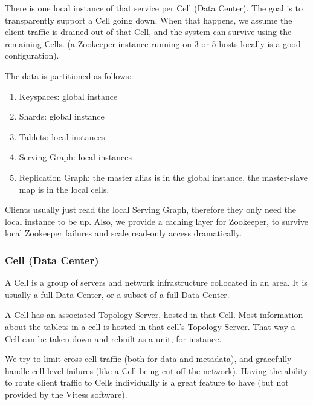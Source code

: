 There is one local instance of that service per Cell (Data Center). The goal is to transparently support a Cell going down. When that happens, we assume the client traffic is drained out of that Cell, and the system can survive
using the remaining Cells. (a Zookeeper instance running on 3 or 5 hosts locally is a good configuration).

The data is partitioned as follows:
\begin{enumerate}
\item Keyspaces: global instance
\item Shards: global instance
\item Tablets: local instances
\item Serving Graph: local instances
\item Replication Graph: the master alias is in the global instance, the master-slave map is in the local cells.
\end{enumerate}


Clients usually just read the local Serving Graph, therefore they only need the local instance to be up. Also, we provide a caching layer for Zookeeper, to survive local Zookeeper failures and scale read-only access dramatically.

\subsubsection{Cell (Data Center)}\hypertarget{cell-data-center}{}\label{cell-data-center}

A Cell is a group of servers and network infrastructure collocated in an area. It is usually a full Data Center, or a subset of a full Data Center.

A Cell has an associated Topology Server, hosted in that Cell. Most information about the tablets in a cell is hosted in that cell's Topology Server. That way a Cell can be taken down and rebuilt as a unit, for instance.

We try to limit cross-cell traffic (both for data and metadata), and gracefully handle cell-level failures (like a Cell being cut off the network). Having the ability to route client traffic to Cells individually is a great feature to have
(but not provided by the Vitess software).

